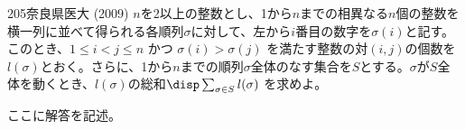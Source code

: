\begin{prob}{205}{}{奈良県医大 (2009)}
 $n$を2以上の整数とし、1から$n$までの相異なる$n$個の整数を横一列に並べて得られる各順列$\sigma$に対して、左から$i$番目の数字を$\sigma(i)$と記す。このとき、$1\le i < j \le n$ かつ $\sigma(i)>\sigma(j)$ を満たす整数の対$(i,j)$の個数を$l(\sigma)$とおく。さらに、1から$n$までの順列$\sigma$全体のなす集合を$S$とする。$\sigma$が$S$全体を動くとき、$l(\sigma)$の総和$\disp \sum_{\sigma\in S} l(\sigma)$ を求めよ。
\end{prob}
ここに解答を記述。